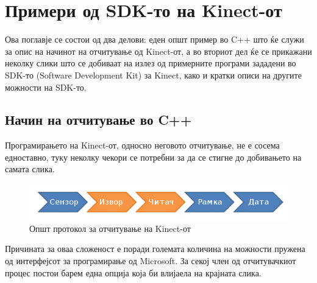 \documentclass[12pt]{article}
\begin{document}
\newpage

\section{Примери од SDK-то на Kinect-от} \label{sec:example}
  Ова поглавје се состои од два делови: еден општ пример во C++ што ќе служи за опис на начинот на отчитување од Kinect-от, а во вториот дел ќе се прикажани неколку слики што се добиваат на излез од примерните програми зададени во SDK-то (Software Development Kit) за Kinect, како и кратки описи на другите можности на SDK-то.

  \subsection{Начин на отчитување во C++}
    Програмирањето на Kinect-от, односно неговото отчитување, не е сосема едноставно, туку неколку чекори се потребни за да се стигне до добивањето на самата слика.

    \begin{figure}[H]
      \includegraphics[width=0.75\linewidth]{./images/programming_flow_trimmed.png}
      \centering
      \caption{Општ протокол за отчитување на Kinect-от}
      \label{fig:programming_flow_trimmed.png}
      \end{figure}

    Причината за оваа сложеност е поради големата количина на можности пружена од интерфејсот за програмирање од Microsoft. За секој член од отчитувачкиот процес постои барем една опција која би влијаела на крајната слика.
\end{document}
